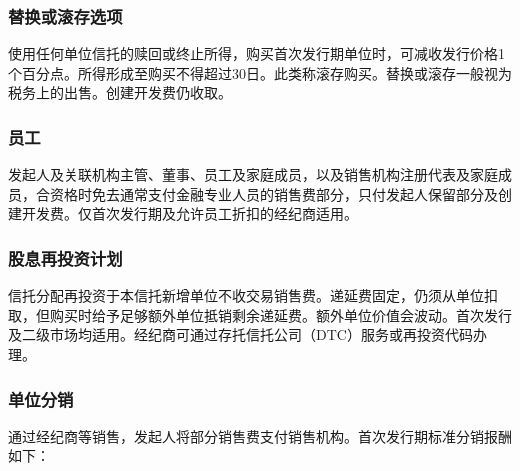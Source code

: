 \documentclass[UTF8,fontset=none,11pt,a4paper]{ctexart}
\begin{document}
\subsubsection*{替换或滚存选项}
使用任何单位信托的赎回或终止所得，购买首次发行期单位时，可减收发行价格1个百分点。所得形成至购买不得超过30日。此类称滚存购买。替换或滚存一般视为税务上的出售。创建开发\allowbreak\mbox{费仍收取。}


\subsubsection*{员工}
发起人及关联机构主管、董事、员工及家庭成员，以及销售机构注册代表及家庭成员，合资格时免去通常支付金融专业人员的销售费部分，只付发起人保留部分及创建开发费。仅首次发行期及允许员工折扣的经\allowbreak\mbox{纪商适用。}


\subsubsection*{股息再投资计划}
信托分配再投资于本信托新增单位不收交易销售费。递延费固定，仍须从单位扣取，但购买时给予足够额外单位抵销剩余递延费。额外单位价值会波动。首次发行及二级市场均适用。经纪商可通过存托信托公司（DTC）服务或再投资代\allowbreak\mbox{码办理。}


\subsubsection*{单位分销}
通过经纪商等销售，发起人将部分销售费支付销售机构。首次发行期标准分销\allowbreak\mbox{报酬如下：}
\end{document}
